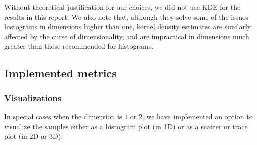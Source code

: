 Without theoretical justification for our choices, we did not use KDE for the results in this report.  We also note that, although they solve some of the issues histograms in dimensions higher than one, kernel density estimates are similarly affected by the curse of dimensionality, and are impractical in dimensions much greater than those recommended for histograms.  

\noindent 

\subsection{Implemented metrics}

\subsubsection{Visualizations}
In special cases when the dimension is $1$ or $2$, we have implemented an option to visualize the samples either as a histogram plot (in 1D) or as a scatter or trace plot (in 2D or 3D).



